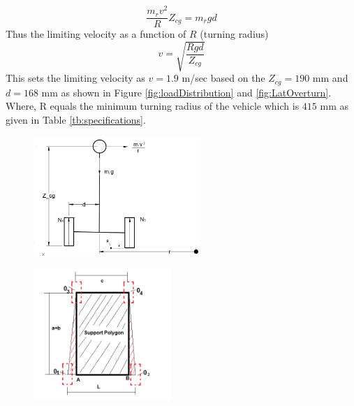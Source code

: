 \begin{equation}
\label{eqn:LatOverturn}
\frac{m_r v^2}{R}Z_{cg}=m_r g d 
\end{equation}
Thus the limiting velocity as a function of $R$  (turning radius)
\begin{equation}
\label{eqn:Vel_limit}
v=\sqrt{\frac{R g d}{Z_{cg}}}
\end{equation}
This sets the limiting velocity as $v=1.9$ m/sec based on the $Z_{cg}=190$ mm and $d=168$ mm as shown in  Figure \ref{fig:loadDistribution} and \ref{fig:LatOverturn}. Where, R equals the minimum turning radius of the vehicle which is $415$ mm as given in Table \ref{tb:specifications}.

\begin{figure}
 	\centering
 	\begin{minipage}{.5\textwidth}
 		\centering
 		\includegraphics[width=.9\linewidth,height=4.5cm,keepaspectratio]{Chapter3/fig/LateralOverturn}
 		\label{fig:LatOverturn}
 	\end{minipage}%
 	\begin{minipage}{.5\textwidth}
 		\centering
 		\includegraphics[height=5cm,keepaspectratio]{Chapter3/fig/Supportpolygon.png}
 		\label{fig:supportPoly}
 	\end{minipage}
 \end{figure}

